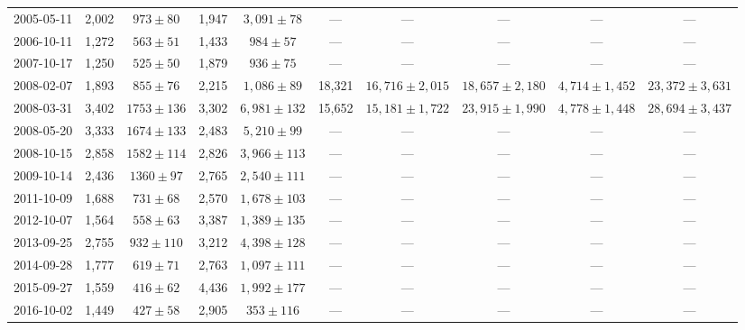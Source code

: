 \begin{landscape}
\begin{longtable}{cccccccccc}
{2005-05-11} & 2,002 & {$973  \pm  80$} & 1,947 & {$3,091 \pm 78$} & --- & --- & --- & --- & --- \\
{2006-10-11} & 1,272 & {$563  \pm  51$} & 1,433 & {$984 \pm 57$} & --- & --- & --- & --- & --- \\
{2007-10-17} & 1,250 & {$525  \pm  50$} & 1,879 & {$936 \pm 75$} & --- & --- & --- & --- & --- \\
{2008-02-07} & 1,893 & {$855  \pm  76$} & 2,215 & {$1,086 \pm 89$} & 18,321 & {$16,716 \pm 2,015$} & {$18,657 \pm 2,180$} & {$4,714 \pm 1,452$} & {$23,372 \pm 3,631$} \\
{2008-03-31} & 3,402 & {$1753  \pm  136$} & 3,302 & {$6,981 \pm 132$} & 15,652 & {$15,181 \pm 1,722$} & {$23,915 \pm 1,990$} & {$4,778 \pm 1,448$} & {$28,694 \pm 3,437$} \\
{2008-05-20} & 3,333 & {$1674  \pm  133$} & 2,483 & {$5,210 \pm 99$} & --- & --- & --- & --- & --- \\
{2008-10-15} & 2,858 & {$1582  \pm  114$} & 2,826 & {$3,966 \pm 113$} & --- & --- & --- & --- & --- \\
{2009-10-14} & 2,436 & {$1360  \pm  97$} & 2,765 & {$2,540 \pm 111$} & --- & --- & --- & --- & --- \\
{2011-10-09} & 1,688 & {$731  \pm  68$} & 2,570 & {$1,678 \pm 103$} & --- & --- & --- & --- & --- \\
{2012-10-07} & 1,564 & {$558  \pm  63$} & 3,387 & {$1,389 \pm 135$} & --- & --- & --- & --- & --- \\
{2013-09-25} & 2,755 & {$932  \pm  110$} & 3,212 & {$4,398 \pm 128$} & --- & --- & --- & --- & --- \\
{2014-09-28} & 1,777 & {$619  \pm  71$} & 2,763 & {$1,097 \pm 111$} & --- & --- & --- & --- & --- \\
{2015-09-27} & 1,559 & {$416  \pm  62$} & 4,436 & {$1,992 \pm 177$} & --- & --- & --- & --- & --- \\
{2016-10-02} & 1,449 & {$427  \pm  58$} & 2,905 & {$353 \pm 116$} & --- & --- & --- & --- & --- \\
\end{longtable} 
\end{landscape} 
